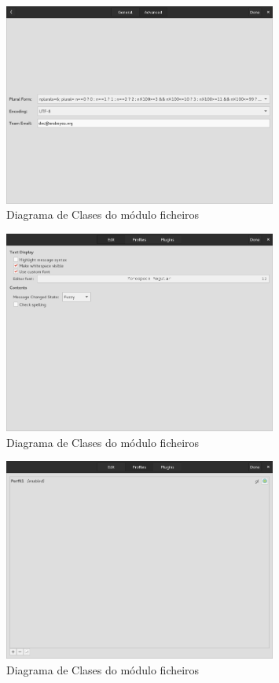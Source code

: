 \begin{figure}[h!]
    \centering
    \includegraphics[width=0.8\textwidth]{img/panel_perfil_avanzado.png}
    \caption{Diagrama de Clases do módulo ficheiros}
    \label{fig:dia_class:files}
\end{figure}

\begin{figure}[h!]
    \centering
    \includegraphics[width=0.8\textwidth]{img/panel_preferencias_edicion.png}
    \caption{Diagrama de Clases do módulo ficheiros}
    \label{fig:dia_class:files}
\end{figure}

\begin{figure}[h!]
    \centering
    \includegraphics[width=0.8\textwidth]{img/panel_preferencias_perfiles.png}
    \caption{Diagrama de Clases do módulo ficheiros}
    \label{fig:dia_class:files}
\end{figure}

